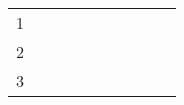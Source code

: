 \begin{table}[ht]
\begin{tabular}{c|lllllllll}
    1                                                                                                          &                                                                              & \textbf{}                                                &                                                           &                                                                &                                                                  &                                                                                                                 &                                                                                                                &                                                                                                                                &                                                            \\
    2                                                                                                          &                                                                              &                                                          &                                                           &                                                                &                                                                  &                                                                                                                 &                                                                                                                &                                                                                                                                &                                                            \\
    3                                                                                                          &                                                                              &                                                          &                                                           &                                                                &                                                                  &                                                                                                                 &                                                                                                                &                                                                                                                                &                                                            \\

\end{tabular}
\end{table}
